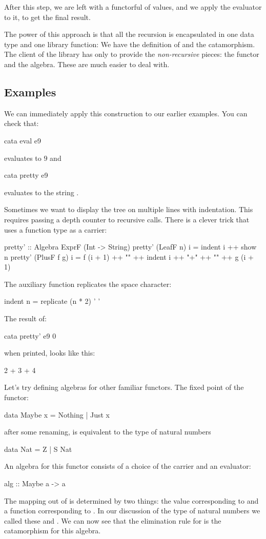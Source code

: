 \documentclass[DaoFP]{subfiles}
\begin{document}
After this step, we are left with a functorful of values, and we apply the evaluator  to it, to get the final result.

The power of this approach is that all the recursion is encapsulated in one data type and one library function: We have the definition of  and the catamorphism. The client of the library has only to provide the \emph{non-recursive} pieces: the functor and the algebra. These are much easier to deal with.

\subsection{Examples}

We can immediately apply this construction to our earlier examples. You can check that:
\begin{haskell}
cata eval e9
\end{haskell}
evaluates to $9$ and
\begin{haskell}
cata pretty e9
\end{haskell}
evaluates to the string .

Sometimes we want to display the tree on multiple lines with indentation. This requires passing a depth counter to recursive calls. There is a clever trick that uses a function type as a carrier:
\begin{haskell}
pretty' :: Algebra ExprF (Int -> String)
pretty' (LeafF n) i = indent i ++ show n
pretty' (PlusF f g) i = f (i + 1) ++ "\n" ++
                        indent i ++ "+" ++ "\n" ++
                        g (i + 1)
\end{haskell}
The auxiliary function  replicates the space character:
\begin{haskell}
indent n = replicate (n * 2) ' '
\end{haskell}
The result of:
\begin{haskell}
cata pretty' e9 0
\end{haskell}
when printed, looks like this:
\begin{haskell}
    2
  +
    3
+
  4
\end{haskell}


Let's try defining algebras for other familiar functors. The fixed point of the  functor:
\begin{haskell}
data Maybe x = Nothing | Just x
\end{haskell}
after some renaming, is equivalent to the type of natural numbers
\begin{haskell}
data Nat = Z | S Nat
\end{haskell}
An algebra for this functor consists of a choice of the carrier  and an evaluator:
\begin{haskell}
alg :: Maybe a -> a
\end{haskell}
The mapping out of  is determined by two things: the value corresponding to  and a function  corresponding to . In our discussion of the type of natural numbers we called these  and . We can now see that the elimination rule for  is the catamorphism for this algebra.
\end{document}
